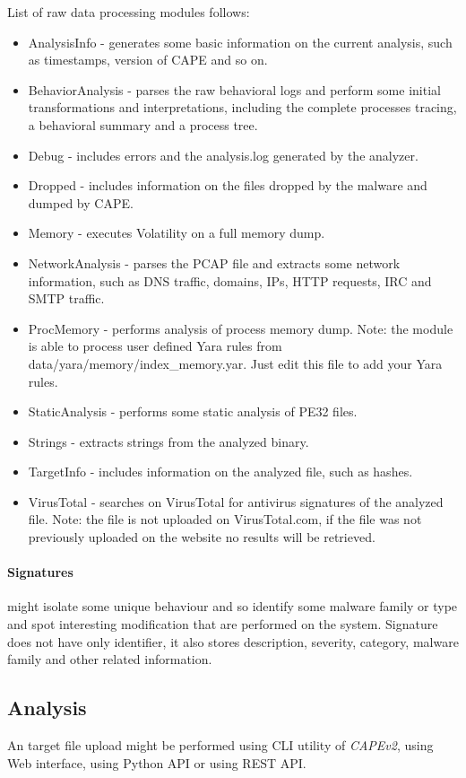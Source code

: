 List of raw data processing modules follows:
\begin{itemize}
  \item AnalysisInfo - generates some basic information on the current analysis, such as timestamps, version of CAPE and so on.
  \item BehaviorAnalysis - parses the raw behavioral logs and perform some initial transformations and interpretations, including the complete processes tracing, a behavioral summary and a process tree.
  \item Debug - includes errors and the analysis.log generated by the analyzer.
  \item Dropped - includes information on the files dropped by the malware and dumped by CAPE.
  \item Memory - executes Volatility on a full memory dump.
  \item NetworkAnalysis - parses the PCAP file and extracts some network information, such as DNS traffic, domains, IPs, HTTP requests, IRC and SMTP traffic.
  \item ProcMemory - performs analysis of process memory dump. Note: the module is able to process user defined Yara rules from data/yara/memory/index_memory.yar. Just edit this file to add your Yara rules.
  \item StaticAnalysis - performs some static analysis of PE32 files.
  \item Strings - extracts strings from the analyzed binary.
  \item TargetInfo - includes information on the analyzed file, such as hashes.
  \item VirusTotal - searches on VirusTotal for antivirus signatures of the analyzed file. Note: the file is not uploaded on VirusTotal.com, if the file was not previously uploaded on the website no results will be retrieved.
\end{itemize}

\paragraph{Signatures} might isolate some unique behaviour and so identify some malware family or type and spot interesting modification that are performed on the system. Signature does not have only identifier, it also stores description, severity, category, malware family and other related information.

\subsection{Analysis}
An target file upload might be performed using CLI utility of \emph{CAPEv2}, using Web interface, using Python API or using REST API.

